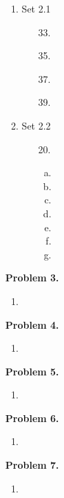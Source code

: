 \documentclass{article}
\begin{document}
\begin{enumerate}
\begin{enumerate}
			\item Set 2.1
			\begin{itemize}
				\item [33.]
				\item [35.]
				\item [37.]
				\item [39.]
			\end{itemize}
			
			\item Set 2.2
			\begin{itemize}
				\item [20.] \quad
				\begin{enumerate}[(a)]
					\item
					\item
					\item
					\item
					\item
					\item
					\item
				\end{enumerate}
			\end{itemize}
		\end{enumerate}
		
		\item [] \textbf{Problem 3.}
		\begin{enumerate}
			\item 
		\end{enumerate}
		
		\item [] \textbf{Problem 4.}
		\begin{enumerate}
			\item 
		\end{enumerate}
		
		\item [] \textbf{Problem 5.}
		\begin{enumerate}
			\item 
		\end{enumerate}
		
		\item [] \textbf{Problem 6.}
		\begin{enumerate}
			\item 
		\end{enumerate}
		
		\item [] \textbf{Problem 7.}
		\begin{enumerate}
			\item 
		\end{enumerate}
	\end{enumerate}
\end{document}
